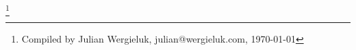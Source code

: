 
\renewcommand*{\thefootnote}{}
\footnote{Compiled by Julian Wergieluk, julian@wergieluk.com, \today}

